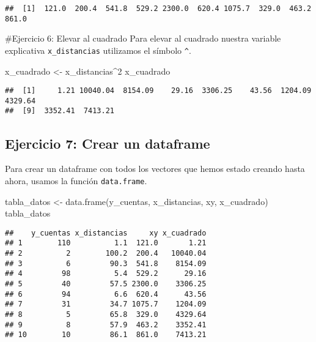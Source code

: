 \documentclass[
]{article}
\newenvironment{Shaded}{\begin{snugshade}}{\end{snugshade}}
\newcommand{\DecValTok}[1]{\textcolor[rgb]{0.00,0.00,0.81}{#1}}
\newcommand{\FunctionTok}[1]{\textcolor[rgb]{0.00,0.00,0.00}{#1}}
\newcommand{\NormalTok}[1]{#1}
\newcommand{\OtherTok}[1]{\textcolor[rgb]{0.56,0.35,0.01}{#1}}
\newcommand{\SpecialCharTok}[1]{\textcolor[rgb]{0.00,0.00,0.00}{#1}}
\begin{document}
\begin{verbatim}
##  [1]  121.0  200.4  541.8  529.2 2300.0  620.4 1075.7  329.0  463.2  861.0
\end{verbatim}

\#Ejercicio 6: Elevar al cuadrado Para elevar al cuadrado nuestra
variable explicativa \texttt{x\_distancias} utilizamos el símbolo
\texttt{\^{}}.

\begin{Shaded}
\begin{Highlighting}[]
\NormalTok{x\_cuadrado }\OtherTok{\textless{}{-}}\NormalTok{ x\_distancias}\SpecialCharTok{\^{}}\DecValTok{2}
\NormalTok{x\_cuadrado}
\end{Highlighting}
\end{Shaded}

\begin{verbatim}
##  [1]     1.21 10040.04  8154.09    29.16  3306.25    43.56  1204.09  4329.64
##  [9]  3352.41  7413.21
\end{verbatim}

\hypertarget{ejercicio-7-crear-un-dataframe}{%
\subsection{Ejercicio 7: Crear un
dataframe}\label{ejercicio-7-crear-un-dataframe}}

Para crear un dataframe con todos los vectores que hemos estado creando
hasta ahora, usamos la función \texttt{data.frame}.

\begin{Shaded}
\begin{Highlighting}[]
\NormalTok{tabla\_datos }\OtherTok{\textless{}{-}} \FunctionTok{data.frame}\NormalTok{(y\_cuentas, x\_distancias, xy, x\_cuadrado)}
\NormalTok{tabla\_datos}
\end{Highlighting}
\end{Shaded}

\begin{verbatim}
##    y_cuentas x_distancias     xy x_cuadrado
## 1        110          1.1  121.0       1.21
## 2          2        100.2  200.4   10040.04
## 3          6         90.3  541.8    8154.09
## 4         98          5.4  529.2      29.16
## 5         40         57.5 2300.0    3306.25
## 6         94          6.6  620.4      43.56
## 7         31         34.7 1075.7    1204.09
## 8          5         65.8  329.0    4329.64
## 9          8         57.9  463.2    3352.41
## 10        10         86.1  861.0    7413.21
\end{verbatim}
\end{document}

